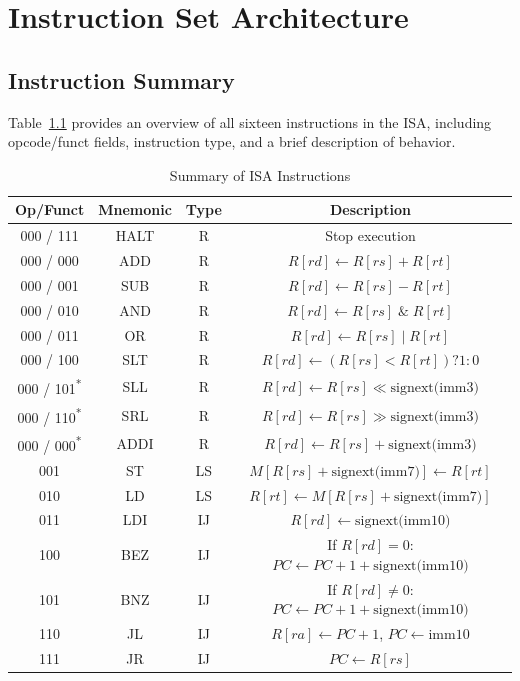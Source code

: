 \documentclass[12pt]{report}
\begin{document}
\clearpage

\chapter{Instruction Set Architecture}

\section{Instruction Summary}

Table~\ref{tab:isa-summary} provides an overview of all sixteen instructions
in the ISA, including opcode/funct fields, instruction type, and a brief 
description of behavior.

\begin{table}[h!]
\centering
\small
\begin{tabular}{cccc}
\toprule
\textbf{Op/Funct} & \textbf{Mnemonic} & \textbf{Type} & \textbf{Description} \\
\midrule
000 / 111 & HALT & R & Stop execution \\ 
000 / 000 & ADD  & R & $R[rd] \leftarrow R[rs] + R[rt]$ \\ 
000 / 001 & SUB  & R & $R[rd] \leftarrow R[rs] - R[rt]$ \\ 
000 / 010 & AND  & R & $R[rd] \leftarrow R[rs] \;\&\; R[rt]$ \\ 
000 / 011 & OR   & R & $R[rd] \leftarrow R[rs] \;|\; R[rt]$ \\ 
000 / 100 & SLT  & R & $R[rd] \leftarrow (R[rs] < R[rt]) ? 1 : 0$ \\ 
000 / 101\textsuperscript{*} & SLL  & R & $R[rd] \leftarrow R[rs] \ll \text{signext(imm3)}$ \\ 
000 / 110\textsuperscript{*} & SRL  & R & $R[rd] \leftarrow R[rs] \gg \text{signext(imm3)}$ \\ 
000 / 000\textsuperscript{*} & ADDI & R & $R[rd] \leftarrow R[rs] + \text{signext(imm3)}$ \\ 
\midrule
001 & ST  & LS & $M[R[rs] + \text{signext(imm7)}] \leftarrow R[rt]$ \\ 
010 & LD  & LS & $R[rt] \leftarrow M[R[rs] + \text{signext(imm7)}]$ \\ 
\midrule
011 & LDI & IJ & $R[rd] \leftarrow \text{signext(imm10)}$ \\ 
100 & BEZ & IJ & If $R[rd] = 0$: $PC \leftarrow PC + 1 + \text{signext(imm10)}$ \\ 
101 & BNZ & IJ & If $R[rd] \neq 0$: $PC \leftarrow PC + 1 + \text{signext(imm10)}$ \\ 
110 & JL  & IJ & $R[ra] \leftarrow PC + 1$, $PC \leftarrow \text{imm10}$ \\ 
111 & JR  & IJ & $PC \leftarrow R[rs]$ \\ 
\bottomrule
\end{tabular}
\caption{Summary of ISA Instructions}
\label{tab:isa-summary}
\end{table}
\end{document}
